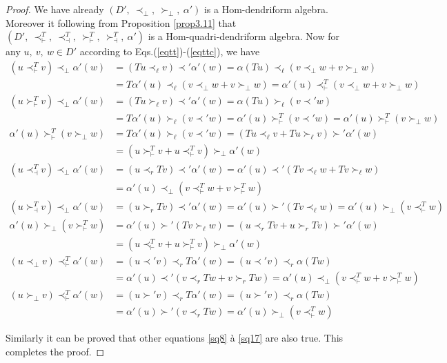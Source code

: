 \documentclass[10pt,a4paper]{amsart}
\begin{document}
\begin{proof}
We have already $(D',\  \prec_\perp,\  \succ_\perp,\  \alpha')$ is a Hom-dendriform algebra. Moreover  it following from Proposition \ref{prop3.11} that $(D',\  \prec^{T}_\vdash,\   \prec^T_\dashv,\  \succ^T_\vdash,\  \succ^T_\dashv,\  \alpha')$ 
is a Hom-quadri-dendriform algebra. Now  for any $u,\  v,\  w\in D'$ according to Eqs.(\ref{eqtt})-(\ref{eqttc}), we have
\begin{align*}
(u \prec^T_{\vdash} v) \prec_{\perp} \alpha'(w)
&= (Tu \prec_{\ell} v) \prec' \alpha'(w) 
= \alpha (Tu) \prec_{\ell}(v \prec_{\perp} w + v \succ_{\perp} w) \\
&= T\alpha'(u) \prec_{\ell} (v \prec_{\perp} w + v \succ_{\perp} w) 
= \alpha'(u) \prec^T_{\vdash} (v \prec_{\perp} w + v \succ_{\perp} w) \\
(u \succ^T_{\vdash} v) \prec_{\perp} \alpha'(w)
&= (Tu \succ_{\ell} v) \prec' \alpha'(w) 
= \alpha(Tu) \succ_{\ell} (v \prec' w) \\
&= T\alpha'(u) \succ_{\ell} (v \prec' w) 
= \alpha'(u) \succ^T_{\vdash} (v \prec' w) 
= \alpha'(u) \succ^T_{\vdash}(v \succ_{\perp} w) \\
\alpha'(u) \succ^T_{\vdash}(v \succ_{\perp} w)
&= T\alpha'(u) \succ_{\ell} (v \prec' w) 
= (Tu \prec_{\ell} v + Tu \succ_{\ell} v) \succ' \alpha'(w) \\
&= (u \succ^T_{\vdash} v + u \prec^T_{\vdash} v) \succ_{\perp} \alpha'(w) \\
(u \prec^T_{\dashv} v) \prec_{\perp} \alpha'(w) 
&= (u \prec_{r} Tv) \prec' \alpha'(w) 
= \alpha'(u) \prec' (Tv \prec_{\ell} w + Tv \succ_{\ell} w) \\
&= \alpha'(u) \prec_{\perp} (v \prec^T_{\vdash} w + v \succ^T_{\vdash} w) \\
(u \succ^T_{\dashv} v) \prec_{\perp} \alpha'(w) 
&= (u \succ_{r} Tv) \prec' \alpha'(w) 
= \alpha'(u) \succ' (Tv \prec_{\ell} w) 
= \alpha'(u) \succ_{\perp} (v \prec^T_{\vdash} w) \\
\alpha'(u) \succ_{\perp} (v \succ^T_{\vdash} w) 
&= \alpha'(u) \succ' (Tv \succ_{\ell} w) 
= (u \prec_{r} Tv + u \succ_{r} Tv) \succ' \alpha'(w) \\
&= (u \prec^T_{\vdash} v + u \succ^T_{\vdash} v) \succ_{\perp} \alpha'(w) \\
(u \prec_{\perp} v) \prec^T_{\vdash} \alpha'(w) 
&= (u \prec' v) \prec_{r} T\alpha'(w) 
= (u \prec' v) \prec_{r} \alpha(Tw) \\
&= \alpha'(u) \prec' (v \prec_{r} Tw + v \succ_{r} Tw) 
= \alpha'(u) \prec_{\perp} (v \prec^T_{\vdash} w + v \succ^T_{\vdash} w) \\
(u \succ_{\perp} v) \prec^T_{\vdash} \alpha'(w) 
&= (u \succ' v) \prec_{r} T\alpha'(w) 
= (u \succ' v) \prec_{r} \alpha(Tw) \\
&= \alpha'(u) \succ' (v \prec_{r} Tw) 
= \alpha'(u) \succ_{\perp} (v \prec^T_{\vdash} w)
\end{align*}

Similarly it can be proved that other equations  \ref{sq8} à \ref{sq17} are also true. This completes the proof.
\end{proof}
\end{document}

